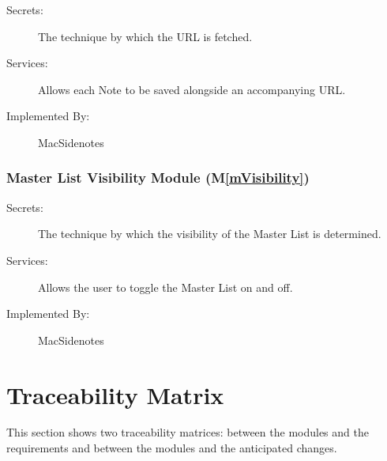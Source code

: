 \documentclass[12pt, titlepage]{article}
\newcommand{\mref}[1]{M\ref{#1}}
\begin{document}
\begin{description}
	\item[Secrets:]The technique by which the URL is fetched.
	\item[Services:]Allows each Note to be saved alongside an accompanying URL.
	\item[Implemented By:] MacSidenotes
\end{description}

\subsubsection{Master List Visibility Module (\mref{mVisibility})}

\begin{description}
	\item[Secrets:]The technique by which the visibility of the Master List is 
	determined.
	\item[Services:]Allows the user to toggle the Master List on and off.
	\item[Implemented By:] MacSidenotes
\end{description}

\section{Traceability Matrix} \label{SecTM}

This section shows two traceability matrices: between the modules and the
requirements and between the modules and the anticipated changes.
\end{document}
